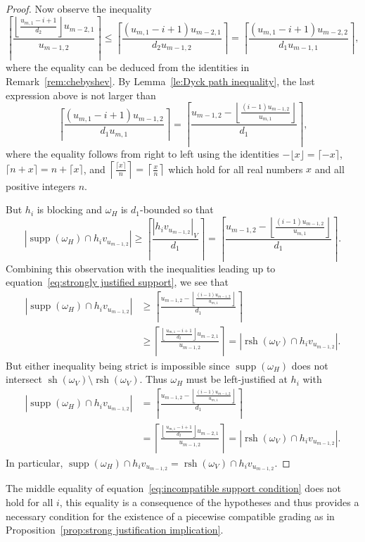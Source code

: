 \documentclass[ALCO,ThmDefs,Unicode,epreuves]{cedram}
\DeclareMathOperator{\supp}{supp}
\DeclareMathOperator{\rsh}{rsh}
\DeclareMathOperator{\sh}{sh}
\begin{document}
\begin{proof}
 Now observe the inequality 
 \[\left\lceil\frac{\left\lfloor\frac{u_{m,1}-i+1}{d_2}\right\rfloor u_{m-2,1}}{u_{m-1,2}}\right\rceil\le\left\lceil\frac{(u_{m,1}-i+1)u_{m-2,1}}{d_2u_{m-1,2}}\right\rceil=\left\lceil\frac{(u_{m,1}-i+1)u_{m-2,2}}{d_1u_{m-1,1}}\right\rceil,\] 
 where the equality can be deduced from the identities in Remark~\ref{rem:chebyshev}.
 By Lemma~\ref{le:Dyck path inequality}, the last expression above is not larger than 
 \begin{equation}
 \label{eq:strongly justified support}
 \left\lceil\frac{(u_{m,1}-i+1)u_{m-1,2}}{d_1u_{m,1}}\right\rceil=\left\lceil\frac{u_{m-1,2}-\left\lfloor\frac{(i-1)u_{m-1,2}}{u_{m,1}}\right\rfloor}{d_1}\right\rceil,
 \end{equation}
 where the equality follows from right to left using the identities $-\lfloor x\rfloor=\lceil-x\rceil$, $\lceil n+x\rceil=n+\lceil x\rceil$, and $\left\lceil\frac{\lceil x\rceil}{n}\right\rceil=\left\lceil\frac{x}{n}\right\rceil$ which hold for all real numbers $x$ and all positive integers $n$.
 
 But $h_i$ is blocking and $\omega_H$ is $d_1$-bounded so that
 \[|\supp(\omega_H)\cap h_iv_{u_{m-1,2}}|\ge\left\lceil\frac{|h_iv_{u_{m-1,2}}|_V}{d_1}\right\rceil=\left\lceil\frac{u_{m-1,2}-\left\lfloor\frac{(i-1)u_{m-1,2}}{u_{m,1}}\right\rfloor}{d_1}\right\rceil.\]
 Combining this observation with the inequalities leading up to equation~\eqref{eq:strongly justified support}, we see that
 \begin{align*}
 |\supp(\omega_H)\cap h_iv_{u_{m-1,2}}|
 &\ge\left\lceil\frac{u_{m-1,2}-\left\lfloor\frac{(i-1)u_{m-1,2}}{u_{m,1}}\right\rfloor}{d_1}\right\rceil\\
 &\ge\left\lceil\frac{\left\lfloor\frac{u_{m,1}-i+1}{d_2}\right\rfloor u_{m-2,1}}{u_{m-1,2}}\right\rceil=|\rsh(\omega_V)\cap h_iv_{u_{m-1,2}}|.
 \end{align*}
 But either inequality being strict is impossible since $\supp(\omega_H)$ does not intersect $\sh(\omega_V)\setminus\rsh(\omega_V)$. 
 Thus $\omega_H$ must be left-justified at $h_i$ with 
 \begin{align}
 \label{eq:incompatible support condition}
 |\supp(\omega_H)\cap h_iv_{u_{m-1,2}}|
 &=\left\lceil\frac{u_{m-1,2}-\left\lfloor\frac{(i-1)u_{m-1,2}}{u_{m,1}}\right\rfloor}{d_1}\right\rceil\\
 \nonumber &=\left\lceil\frac{\left\lfloor\frac{u_{m,1}-i+1}{d_2}\right\rfloor u_{m-2,1}}{u_{m-1,2}}\right\rceil=|\rsh(\omega_V)\cap h_iv_{u_{m-1,2}}|.
 \end{align}
 In particular, $\supp(\omega_H)\cap h_iv_{u_{m-1,2}}=\rsh(\omega_V)\cap h_iv_{u_{m-1,2}}$.
\end{proof}
\begin{remark}
 The middle equality of equation~\eqref{eq:incompatible support condition} does not hold for all $i$, this equality is a consequence of the hypotheses and thus provides a necessary condition for the existence of a piecewise compatible grading as in Proposition~\ref{prop:strong justification implication}.
\end{remark} 
\end{document}
